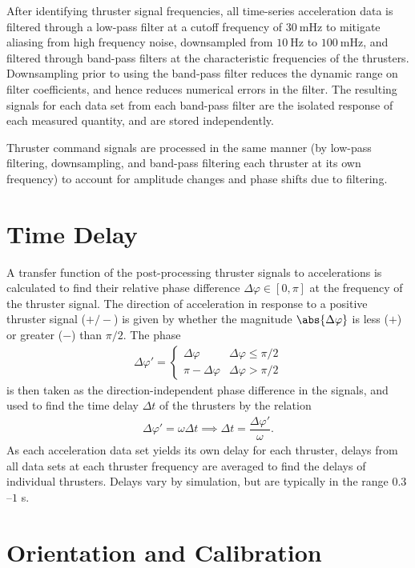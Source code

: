 \documentclass[10pt,twocolumn]{article}
\renewcommand{\t}{\text} %
\newcommand{\f}[2]{\dfrac{#1}{#2}} %
\renewcommand{\phi}{\varphi} %
\begin{document}
After identifying thruster signal frequencies, all time-series
acceleration data is filtered through a low-pass filter at a cutoff
frequency of $30~\t{mHz}$ to mitigate aliasing from high frequency
noise, downsampled from $10~\t{Hz}$ to $100~\t{mHz}$, and filtered
through band-pass filters at the characteristic frequencies of the
thrusters. Downsampling prior to using the band-pass filter reduces
the dynamic range on filter coefficients, and hence reduces numerical
errors in the filter. The resulting signals for each data set from
each band-pass filter are the isolated response of each measured
quantity, and are stored independently.

Thruster command signals are processed in the same manner (by low-pass
filtering, downsampling, and band-pass filtering each thruster at its
own frequency) to account for amplitude changes and phase shifts due
to filtering.

\section*{Time Delay}

A transfer function of the post-processing thruster signals to
accelerations is calculated to find their relative phase difference
$\Delta\phi\in[0,\pi]$ at the frequency of the thruster signal. The
direction of acceleration in response to a positive thruster signal
($+/-$) is given by whether the magnitude $\abs{\Delta\phi}$ is less
($+$) or greater ($-$) than $\pi/2$. The phase
\begin{align}
  \Delta\phi'=\left\{
    \begin{array}{ll}
      \Delta\phi & \Delta\phi \le \pi/2 \\
      \pi-\Delta\phi & \Delta\phi > \pi/2
    \end{array}\right.
\end{align}
is then taken as the direction-independent phase difference in the
signals, and used to find the time delay $\Delta t$ of the thrusters
by the relation
\begin{align}
  \Delta\phi'=\omega\Delta t\implies\Delta t=\f{\Delta\phi'}\omega.
\end{align}
As each acceleration data set yields its own delay for each thruster,
delays from all data sets at each thruster frequency are averaged to
find the delays of individual thrusters. Delays vary by simulation,
but are typically in the range $0.3$--$1$ s.

\section*{Orientation and Calibration}
\end{document}
